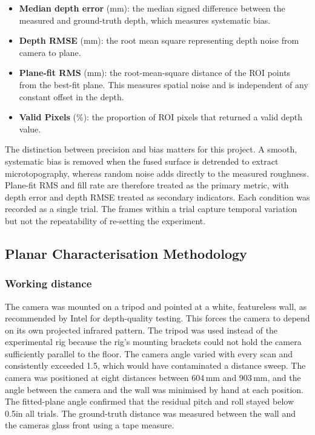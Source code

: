 \begin{itemize}
	\item \textbf{Median depth error} (mm): the median signed difference between the measured and ground-truth depth, which measures systematic bias.
	
	\item \textbf{Depth RMSE} (mm): the root mean square representing depth noise from camera to plane.
	
	\item \textbf{Plane-fit RMS} (mm): the root-mean-square distance of the ROI points from the best-fit plane. This measures spatial noise and is independent of any constant offset in the depth.
	
	\item \textbf{Valid Pixels} (\%): the proportion of ROI pixels that returned a valid depth value.
\end{itemize}

The distinction between precision and bias matters for this project. A smooth, systematic bias is removed when the fused surface is detrended to extract microtopography, whereas random noise adds directly to the measured roughness. Plane-fit RMS and fill rate are therefore treated as the primary metric, with depth error and depth RMSE treated as secondary indicators. Each condition was recorded as a single trial. The frames within a trial capture temporal variation but not the repeatability of re-setting the experiment.

\subsection{Planar Characterisation Methodology}

\subsubsection{Working distance}

The camera was mounted on a tripod and pointed at a white, featureless wall, as recommended by Intel for depth-quality testing. This forces the camera to depend on its own projected infrared pattern. The tripod was used instead of the experimental rig because the rig's mounting brackets could not hold the camera sufficiently parallel to the floor. The camera angle varied with every scan and consistently exceeded 1.5\degree, which would have contaminated a distance sweep. The camera was positioned at eight distances between 604\,mm and 903\,mm, and the angle between the camera and the wall was minimised by hand at each position. The fitted-plane angle confirmed that the residual pitch and roll stayed below 0.5\degree in all trials. The ground-truth distance was measured between the wall and the cameras glass front using a tape measure.

